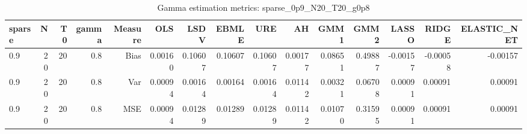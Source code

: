 \begin{table}[!htbp]\centering
\caption{Gamma estimation metrics: sparse_0p9_N20_T20_g0p8}
\label{tab:table1_sparse_0p9_N20_T20_g0p8}
\begin{tabular}{lrrrrrrrrrrrrrr}
\hline
sparse & N & T0 & gamma & Measure & OLS & LSDV & EBMLE & URE & AH & GMM1 & GMM2 & LASSO & RIDGE & ELASTIC_NET \\
\hline
0.9 & 20 & 20 & 0.8 & Bias & 0.00160 & 0.10607 & 0.10607 & 0.10607 & 0.00177 & 0.08651 & 0.49887 & -0.00157 & -0.00058 & -0.00157 \\
0.9 & 20 & 20 & 0.8 & Var & 0.00094 & 0.00164 & 0.00164 & 0.00164 & 0.01142 & 0.00321 & 0.06708 & 0.00091 & 0.00091 & 0.00091 \\
0.9 & 20 & 20 & 0.8 & MSE & 0.00094 & 0.01289 & 0.01289 & 0.01289 & 0.01142 & 0.01070 & 0.31595 & 0.00091 & 0.00091 & 0.00091 \\
\hline
\end{tabular}
\end{table}

